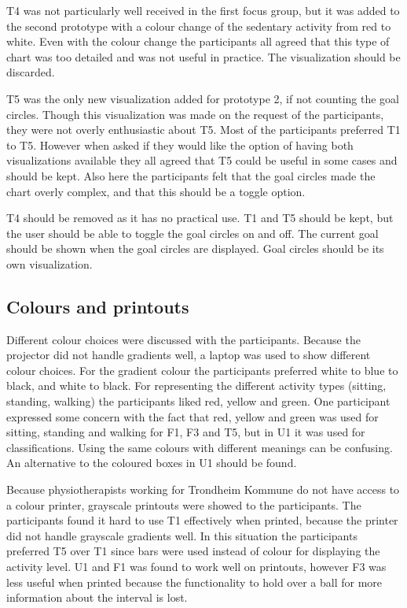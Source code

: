 T4 was not particularly well received in the first focus group, but it was added to the second prototype with a colour change of the sedentary activity from red to white. Even with the colour change the participants all agreed that this type of chart was too detailed and was not useful in practice. The visualization should be discarded.

T5 was the only new visualization added for prototype 2, if not counting the goal circles. Though this visualization was made on the request of the participants, they were not overly enthusiastic about T5. Most of the participants preferred T1 to T5. However when asked if they would like the option of having both visualizations available they all agreed that T5 could be useful in some cases and should be kept. Also here the participants felt that the goal circles made the chart overly complex, and that this should be a toggle option.

T4 should be removed as it has no practical use. T1 and T5 should be kept, but the user should be able to toggle the goal circles on and off. The current goal should be shown when the goal circles are displayed. Goal circles should be its own visualization.

\subsection{Colours and printouts}
Different colour choices were discussed with the participants. Because the projector did not handle gradients well, a laptop was used to show different colour choices. For the gradient colour the participants preferred white to blue to black, and white to black. For representing the different activity types (sitting, standing, walking) the participants liked red, yellow and green. One participant expressed some concern with the fact that red, yellow and green was used for sitting, standing and walking for F1, F3 and T5, but in U1 it was used for classifications. Using the same colours with different meanings can be confusing. An alternative to the coloured boxes in U1 should be found.

Because physiotherapists working for Trondheim Kommune do not have access to a colour printer, grayscale printouts were showed to the participants. The participants found it hard to use T1 effectively when printed, because the printer did not handle grayscale gradients well. In this situation the participants preferred T5 over T1 since bars were used instead of colour for displaying the activity level. U1 and F1 was found to work well on printouts, however F3 was less useful when printed because the functionality to hold over a ball for more information about the interval is lost.

